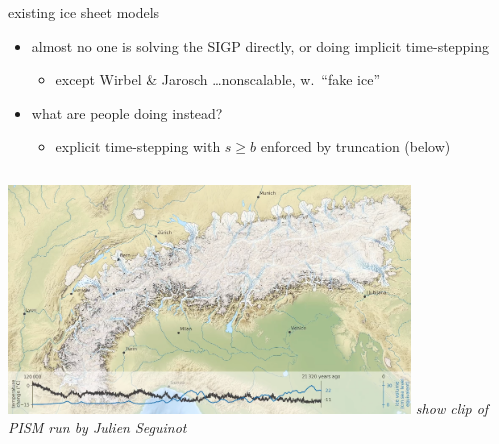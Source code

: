 \documentclass{beamer}
\begin{document}
\begin{frame}{existing ice sheet models}

\begin{itemize}
\item almost no one is solving the SIGP directly, or doing implicit time-stepping
    \begin{itemize}
    \item except Wirbel \& Jarosch \cite{WirbelJarosch2020} \dots nonscalable, w.~``fake ice''
    \end{itemize}
\item what are people doing instead?
    \begin{itemize}
    \item \alert{explicit time-stepping with $s \ge b$ enforced by truncation} (below)
    \end{itemize}
\end{itemize}

\medskip
\begin{columns}
        \hfill \includegraphics[width=0.8\textwidth]{figs/seguinot.png}
        \scriptsize \emph{show clip of PISM run by Julien Seguinot}
\end{columns}
\end{frame}
\end{document}
